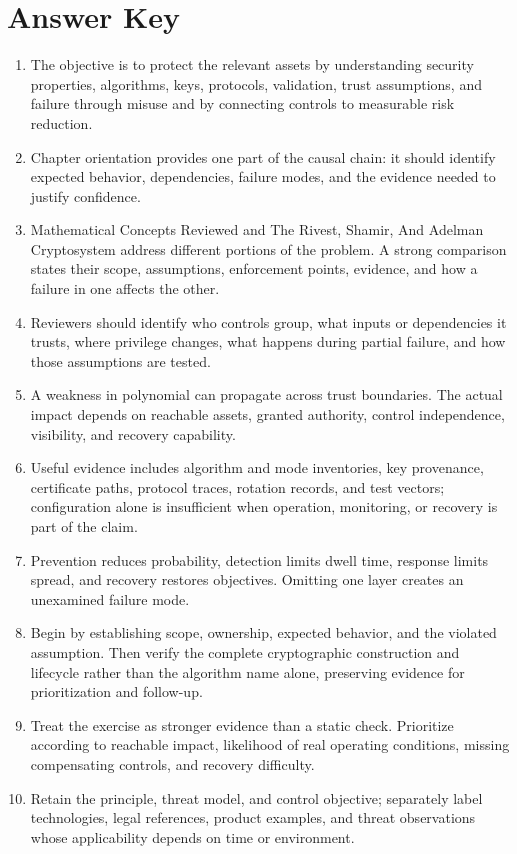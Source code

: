 \documentclass[11pt]{article}
\begin{document}
\section*{Answer Key}
\begin{enumerate}
\item The objective is to protect the relevant assets by understanding security properties, algorithms, keys, protocols, validation, trust assumptions, and failure through misuse and by connecting controls to measurable risk reduction.
\item Chapter orientation provides one part of the causal chain: it should identify expected behavior, dependencies, failure modes, and the evidence needed to justify confidence.
\item Mathematical Concepts Reviewed and The Rivest, Shamir, And Adelman Cryptosystem address different portions of the problem. A strong comparison states their scope, assumptions, enforcement points, evidence, and how a failure in one affects the other.
\item Reviewers should identify who controls group, what inputs or dependencies it trusts, where privilege changes, what happens during partial failure, and how those assumptions are tested.
\item A weakness in polynomial can propagate across trust boundaries. The actual impact depends on reachable assets, granted authority, control independence, visibility, and recovery capability.
\item Useful evidence includes algorithm and mode inventories, key provenance, certificate paths, protocol traces, rotation records, and test vectors; configuration alone is insufficient when operation, monitoring, or recovery is part of the claim.
\item Prevention reduces probability, detection limits dwell time, response limits spread, and recovery restores objectives. Omitting one layer creates an unexamined failure mode.
\item Begin by establishing scope, ownership, expected behavior, and the violated assumption. Then verify the complete cryptographic construction and lifecycle rather than the algorithm name alone, preserving evidence for prioritization and follow-up.
\item Treat the exercise as stronger evidence than a static check. Prioritize according to reachable impact, likelihood of real operating conditions, missing compensating controls, and recovery difficulty.
\item Retain the principle, threat model, and control objective; separately label technologies, legal references, product examples, and threat observations whose applicability depends on time or environment.
\end{enumerate}
\end{document}
